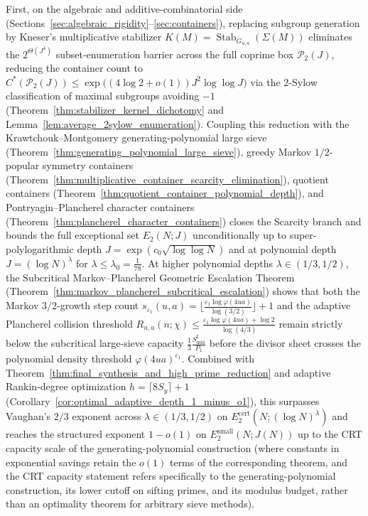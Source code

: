 \documentclass[11pt, a4paper]{article}
\theoremstyle{plain}
\theoremstyle{definition}
\begin{document}
First, on the algebraic and additive-combinatorial side (Sections~\ref{sec:algebraic_rigidity}--\ref{sec:containers}), replacing subgroup generation by Kneser's multiplicative stabilizer $K(M)=\operatorname{Stab}_{G_{u,a}}(\Sigma(M))$ eliminates the $2^{\Theta(J^{4})}$ subset-enumeration barrier across the full coprime box $\mathcal{P}_2(J)$, reducing the container count to $C^{\ast}(\mathcal{P}_2(J))\le\exp\big((4\log 2+o(1))J^{2}\log\log J\big)$ via the $2$-Sylow classification of maximal subgroups avoiding $-1$ (Theorem~\ref{thm:stabilizer_kernel_dichotomy} and Lemma~\ref{lem:average_2sylow_enumeration}). Coupling this reduction with the Krawtchouk--Montgomery generating-polynomial large sieve (Theorem~\ref{thm:generating_polynomial_large_sieve}), greedy Markov $1/2$-popular symmetry containers (Theorem~\ref{thm:multiplicative_container_scarcity_elimination}), quotient containers (Theorem~\ref{thm:quotient_container_polynomial_depth}), and Pontryagin--Plancherel character containers (Theorem~\ref{thm:plancherel_character_containers}) closes the Scarcity branch and bounds the full exceptional set $E_2(N;J)$ unconditionally up to super-polylogarithmic depth $J=\exp(c_0\sqrt{\log\log N})$ and at polynomial depth $J=(\log N)^{\lambda}$ for $\lambda\le\lambda_0=\frac{1}{78}$. At higher polynomial depths $\lambda\in(1/3,1/2)$, the Subcritical Markov--Plancherel Geometric Escalation Theorem (Theorem~\ref{thm:markov_plancherel_subcritical_escalation}) shows that both the Markov $3/2$-growth step count $s_{\varepsilon_1}(u,a)=\lfloor\frac{\varepsilon_1\log\varphi(4ua)}{\log(3/2)}\rfloor+1$ and the adaptive Plancherel collision threshold $R_{u,a}(n;\chi)\le\frac{\varepsilon_1\log\varphi(4ua)+\log 2}{\log(4/3)}$ remain strictly below the subcritical large-sieve capacity $\frac13\frac{S_{\min}^{\mathrm{I}}}{P_1}$ before the divisor sheet crosses the polynomial density threshold $\varphi(4ua)^{\varepsilon_1}$. Combined with Theorem~\ref{thm:final_synthesis_and_high_prime_reduction} and adaptive Rankin-degree optimization $h=\lceil 8S_y\rceil+1$ (Corollary~\ref{cor:optimal_adaptive_depth_1_minus_o1}), this surpasses Vaughan's $2/3$ exponent across $\lambda\in(1/3,1/2)$ on $E_2^{\mathrm{cert}}(N;(\log N)^{\lambda})$ and reaches the structured exponent $1-o(1)$ on $E_2^{\mathrm{small}}(N;J(N))$ up to the CRT capacity scale of the generating-polynomial construction (where constants in exponential savings retain the $o(1)$ terms of the corresponding theorem, and the CRT capacity statement refers specifically to the generating-polynomial construction, its lower cutoff on sifting primes, and its modulus budget, rather than an optimality theorem for arbitrary sieve methods).
\end{document}
